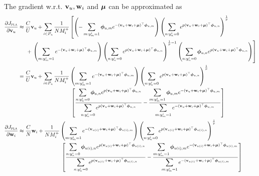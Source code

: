 The gradient w.r.t. $\mathbf{v}_u, \mathbf{w}_i$ and $\bm{\mu}$ can be approximated as 
\begin{equation*}
\begin{aligned}
\frac{\partial J_\textsc{pla}}{\partial \bv_u}
&\approx \frac{C}{U} \bv_u
  + \sum_{i \in P_u} \frac{1}{N M_i^+} \left[
    \left(-\sum_{m: y_m^i = 1} \phibm_{u,m} e^{-(\bv_u + \w_i + \mubm)^\top \phibm_{u,m}} \right)
    \left( \sum_{n: y_n^i = 0} e^{p (\bv_u + \w_i + \mubm)^\top \phibm_{u,n}} \right)^\frac{1}{p} \right. \\
& \hspace{1.5em} + \left.
    \left( \sum_{m: y_m^i = 1} e^{-(\bv_u + \w_i + \mubm)^\top \phibm_{u,m}} \right)
    \left( \sum_{n: y_n^i = 0} e^{p (\bv_u + \w_i + \mubm)^\top \phibm_{u,n}} \right)^{\frac{1}{p} - 1}
    \left( \sum_{n: y_n^i = 0} \phibm_{u,n} e^{p (\bv_u + \w_i + \mubm)^\top \phibm_{u,n}} \right) \right] \\
&= \frac{C}{U} \bv_u
  + \sum_{i \in P_u} \frac{1}{N M_i^+} 
    \left( \sum_{m: y_m^i = 1} e^{-(\bv_u + \w_i + \mubm)^\top \phibm_{u,m}} \right)
    \left( \sum_{n: y_n^i = 0} e^{p (\bv_u + \w_i + \mubm)^\top \phibm_{u,n}} \right)^\frac{1}{p} \\
& \hspace{9.8em} \left[ 
    \frac{ \displaystyle \sum_{n: y_n^i = 0} \phibm_{u,n} e^{p (\bv_u + \w_i + \mubm)^\top \phibm_{u,n}} }
         { \displaystyle \sum_{n: y_n^i = 0} e^{p (\bv_u + \w_i + \mubm)^\top \phibm_{u,n}} }
    - \frac{ \displaystyle \sum_{m: y_m^i = 1} \phibm_{u,m} e^{-(\bv_u + \w_i + \mubm)^\top \phibm_{u,m}} }
           { \displaystyle \sum_{m: y_m^i = 1} e^{-(\bv_u + \w_i + \mubm)^\top \phibm_{u,m}} } \right] \\
%
\frac{\partial J_\textsc{pla}}{\partial \w_i}
&\approx \frac{C}{N} \w_i
  + \frac{1}{N M_i^+} 
    \left( \sum_{m: y_m^i = 1} e^{-(\bv_{u(i)} + \w_i + \mubm)^\top \phibm_{u(i),m}} \right)
    \left( \sum_{n: y_n^i = 0} e^{p (\bv_{u(i)} + \w_i + \mubm)^\top \phibm_{u(i),n}} \right)^\frac{1}{p} \\
& \hspace{8em} \left[ 
    \frac{ \displaystyle \sum_{n: y_n^i = 0} \phibm_{u(i),n} e^{p (\bv_{u(i)} + \w_i + \mubm)^\top \phibm_{u(i),n}} }
         { \displaystyle \sum_{n: y_n^i = 0} e^{p (\bv_{u(i)} + \w_i + \mubm)^\top \phibm_{u(i),n}} }
    - \frac{ \displaystyle \sum_{m: y_m^i = 1} \phibm_{u(i),m} e^{-(\bv_{u(i)} + \w_i + \mubm)^\top \phibm_{u(i),m}} }
           { \displaystyle \sum_{m: y_m^i = 1} e^{-(\bv_{u(i)} + \w_i + \mubm)^\top \phibm_{u(i),m}} } \right] \\

\end{aligned}
\end{equation*}

